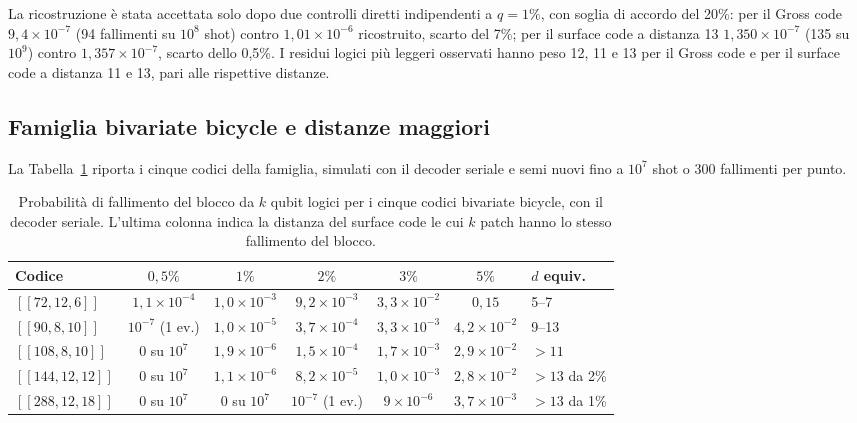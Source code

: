 \begin{onehalfspace}
La ricostruzione è stata accettata solo dopo due controlli diretti
indipendenti a $q = 1\%$, con soglia di accordo del 20\%: per il Gross
code $9{,}4\times10^{-7}$ (94 fallimenti su $10^8$ shot) contro
$1{,}01\times10^{-6}$ ricostruito, scarto del 7\%; per il surface code a
distanza 13 $1{,}350\times10^{-7}$ (135 su $10^9$) contro
$1{,}357\times10^{-7}$, scarto dello 0,5\%. I residui logici più leggeri
osservati hanno peso 12, 11 e 13 per il Gross code e per il surface code
a distanza 11 e 13, pari alle rispettive distanze.

\subsection{Famiglia bivariate bicycle e distanze maggiori}
\label{app:gross_famiglia}

La Tabella~\ref{tab:app_gross_famiglia} riporta i cinque codici della
famiglia, simulati con il decoder seriale e semi nuovi fino a $10^7$
shot o 300 fallimenti per punto.

\begin{table}[H]

\centering
\small
\setlength{\tabcolsep}{3pt}
\begin{tabular}{@{}lcccccl@{}}
\toprule
\textbf{Codice} & $0{,}5\%$ & $1\%$ & $2\%$ & $3\%$ & $5\%$ & \textbf{$d$ equiv.} \\
\midrule
$[[72,12,6]]$ & $1{,}1\times10^{-4}$ & $1{,}0\times10^{-3}$ & $9{,}2\times10^{-3}$ & $3{,}3\times10^{-2}$ & $0{,}15$ & 5--7 \\
\addlinespace[0.3em]
$[[90,8,10]]$ & $10^{-7}$ (1 ev.) & $1{,}0\times10^{-5}$ & $3{,}7\times10^{-4}$ & $3{,}3\times10^{-3}$ & $4{,}2\times10^{-2}$ & 9--13 \\
\addlinespace[0.3em]
$[[108,8,10]]$ & 0 su $10^7$ & $1{,}9\times10^{-6}$ & $1{,}5\times10^{-4}$ & $1{,}7\times10^{-3}$ & $2{,}9\times10^{-2}$ & $>11$ \\
\addlinespace[0.3em]
$[[144,12,12]]$ & 0 su $10^7$ & $1{,}1\times10^{-6}$ & $8{,}2\times10^{-5}$ & $1{,}0\times10^{-3}$ & $2{,}8\times10^{-2}$ & $>13$ da 2\% \\
\addlinespace[0.3em]
$[[288,12,18]]$ & 0 su $10^7$ & 0 su $10^7$ & $10^{-7}$ (1 ev.) & $9\times10^{-6}$ & $3{,}7\times10^{-3}$ & $>13$ da 1\% \\
\bottomrule
\end{tabular}
\caption[Famiglia bivariate bicycle]{Probabilità di fallimento del
blocco da $k$ qubit logici per i cinque codici bivariate bicycle, con il
decoder seriale. L'ultima colonna indica la distanza del surface code
le cui $k$ patch hanno lo stesso fallimento del blocco.}\label{tab:app_gross_famiglia}


\end{table}
\end{onehalfspace}
